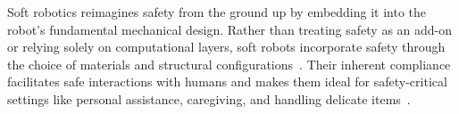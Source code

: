 Soft robotics reimagines safety from the ground up by embedding it into the robot’s fundamental mechanical design. Rather than treating safety as an add-on or relying solely on computational layers, soft robots incorporate safety through the choice of materials and structural configurations~\citep{rus2015design, laschi2016soft}. Their inherent compliance facilitates safe interactions with humans and makes them ideal for safety-critical settings like personal assistance, caregiving, and handling delicate items~\citep{abidi2017intrinsic, yumbla2021human}.
